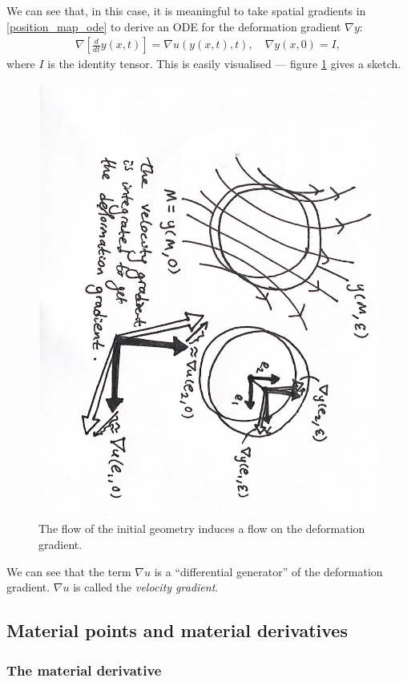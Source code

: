 We can see that, in this case, it is meaningful to take spatial gradients in \eqref{position_map_ode} to derive an ODE for the deformation gradient $\nabla y$:
\begin{equation}\label{deformation_gradient_ode}
\begin{split}
    \nabla \left[\frac{d}{dt} y(x, t)\right] = \nabla u(y(x, t), t),\quad
    \nabla y(x, 0) = I,
\end{split}
\end{equation}
where $I$ is the identity tensor. This is easily visualised --- figure \ref{sketch_flow_vis} gives a sketch.
\begin{figure}[H]
\centerline{\includegraphics[angle=90,page=1,width=0.58\linewidth]{figures/1.pdf}}
\caption{\small
    The flow of the initial geometry induces a flow on the deformation gradient.
}
\label{sketch_flow_vis}
\end{figure}
We can see that the term $\nabla u$ is a ``differential generator'' of the deformation gradient.
$\nabla u$ is called the \textit{velocity gradient}.
\subsection{Material points and material derivatives}\label{material_points}
\subsubsection{The material derivative}

